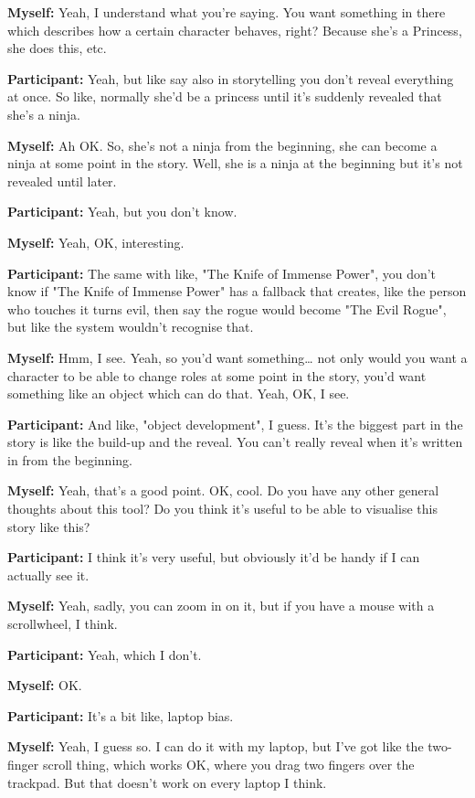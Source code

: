 \documentclass[11pt]{report}
\begin{document}
\begin{linenumbers}
\textbf{Myself:} Yeah, I understand what you're saying. You want something in there which describes how a certain character behaves, right? Because she's a Princess, she does this, etc.

\textbf{Participant:} Yeah, but like say also in storytelling you don't reveal everything at once. So like, normally she'd be a princess until it's suddenly revealed that she's a ninja.

\textbf{Myself:} Ah OK. So, she's not a ninja from the beginning, she can become a ninja at some point in the story. Well, she is a ninja at the beginning but it's not revealed until later.

\textbf{Participant:} Yeah, but you don't know.

\textbf{Myself:} Yeah, OK, interesting.

\textbf{Participant:} The same with like, "The Knife of Immense Power", you don't know if "The Knife of Immense Power" has a fallback that creates, like the person who touches it turns evil, then say the rogue would become "The Evil Rogue", but like the system wouldn't recognise that.

\textbf{Myself:} Hmm, I see. Yeah, so you'd want something\ldots{} not only would you want a character to be able to change roles at some point in the story, you'd want something like an object which can do that. Yeah, OK, I see.

\textbf{Participant:} And like, "object development", I guess. It's the biggest part in the story is like the build-up and the reveal. You can't really reveal when it's written in from the beginning.

\textbf{Myself:} Yeah, that's a good point. OK, cool. Do you have any other general thoughts about this tool? Do you think it's useful to be able to visualise this story like this?

\textbf{Participant:} I think it's very useful, but obviously it'd be handy if I can actually see it.

\textbf{Myself:} Yeah, sadly, you can zoom in on it, but if you have a mouse with a scrollwheel, I think.

\textbf{Participant:} Yeah, which I don't.

\textbf{Myself:} OK.

\textbf{Participant:} It's a bit like, laptop bias.

\textbf{Myself:} Yeah, I guess so. I can do it with my laptop, but I've got like the two-finger scroll thing, which works OK, where you drag two fingers over the trackpad. But that doesn't work on every laptop I think.


\end{linenumbers}
\end{document}

